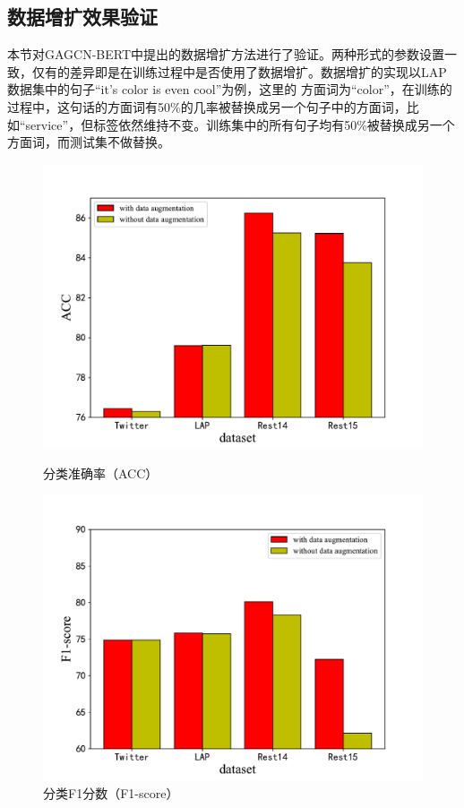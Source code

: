 \subsection{数据增扩效果验证}
本节对GAGCN-BERT中提出的数据增扩方法进行了验证。两种形式的参数设置一致，仅有的差异即是在训练过程中是否使用了数据增扩。数据增扩的实现以LAP数据集中的句子“it's color is even cool”为例，这里的
方面词为“color”，在训练的过程中，这句话的方面词有50\%的几率被替换成另一个句子中的方面词，比如“service”，但标签依然维持不变。训练集中的所有句子均有50\%被替换成另一个方面词，而测试集不做替换。
\begin{figure}[htb]
    \begin{minipage}[t]{0.5\linewidth}
    \centering
    \includegraphics[width=1\textwidth]{pic/DAACC.pdf}
    \caption{分类准确率（ACC）}
    \label{DAACC}
    \end{minipage}
    \quad
    \begin{minipage}[t]{0.5\linewidth}
    \centering
    \includegraphics[width=1\textwidth]{pic/DAF1.pdf}
    \caption{分类F1分数（F1-score）}
    \label{DAF1}
    \end{minipage}
\end{figure}

